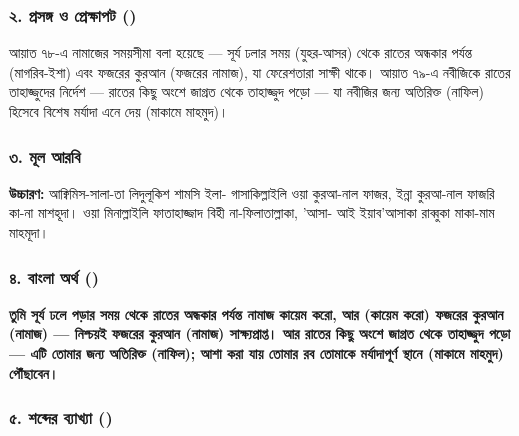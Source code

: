 \subsubsection*{২. প্রসঙ্গ ও প্রেক্ষাপট ()}

আয়াত ৭৮-এ নামাজের সময়সীমা বলা হয়েছে — সূর্য ঢলার সময় (যুহর-আসর) থেকে রাতের অন্ধকার পর্যন্ত (মাগরিব-ইশা) এবং ফজরের কুরআন (ফজরের নামাজ), যা ফেরেশতারা সাক্ষী থাকে। আয়াত ৭৯-এ নবীজিকে রাতের তাহাজ্জুদের নির্দেশ — রাতের কিছু অংশে জাগ্রত থেকে তাহাজ্জুদ পড়ো — যা নবীজির জন্য অতিরিক্ত (নাফিল) হিসেবে বিশেষ মর্যাদা এনে দেয় (মাকামে মাহমুদ)।

\subsubsection*{৩. মূল আরবি}

\begin{center}\end{center}

\textbf{উচ্চারণ:} আক্বিমিস-সালা-তা লিদুলূকিশ শামসি ইলা- গাসাকিল্লাইলি ওয়া কুরআ-নাল ফাজর, ইন্না কুরআ-নাল ফাজরি কা-না মাশহূদা। ওয়া মিনাল্লাইলি ফাতাহাজ্জাদ বিহী না-ফিলাতাল্লাকা, 'আসা- আই ইয়াব'আসাকা রাব্বুকা মাকা-মাম মাহমূদা।

\subsubsection*{৪. বাংলা অর্থ ()}

\textbf{তুমি সূর্য ঢলে পড়ার সময় থেকে রাতের অন্ধকার পর্যন্ত নামাজ কায়েম করো, আর (কায়েম করো) ফজরের কুরআন (নামাজ) — নিশ্চয়ই ফজরের কুরআন (নামাজ) সাক্ষ্যপ্রাপ্ত। আর রাতের কিছু অংশে জাগ্রত থেকে তাহাজ্জুদ পড়ো — এটি তোমার জন্য অতিরিক্ত (নাফিল); আশা করা যায় তোমার রব তোমাকে মর্যাদাপূর্ণ স্থানে (মাকামে মাহমুদ) পৌঁছাবেন।}

\subsubsection*{৫. শব্দের ব্যাখ্যা ()}

